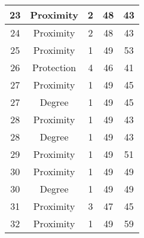 \documentclass[results.tex]{subfiles}
\begin{document}
\begin{center}
\begin{tabular}{| c || c | c | c | c |}
            \hline
            23                      & Proximity                    & 2                      & 48                      & 43                   \\
            \hline
            24                      & Proximity                    & 2                      & 48                      & 43                   \\
            \hline
            25                      & Proximity                    & 1                      & 49                      & 53                   \\
            \hline
            26                      & Protection                   & 4                      & 46                      & 41                   \\
            \hline
            27                      & Proximity                    & 1                      & 49                      & 45                   \\
            \hline
            27                      & Degree                       & 1                      & 49                      & 45                   \\
            \hline
            28                      & Proximity                    & 1                      & 49                      & 43                   \\
            \hline
            28                      & Degree                       & 1                      & 49                      & 43                   \\
            \hline
            29                      & Proximity                    & 1                      & 49                      & 51                   \\
            \hline
            30                      & Proximity                    & 1                      & 49                      & 49                   \\
            \hline
            30                      & Degree                       & 1                      & 49                      & 49                   \\
            \hline
            31                      & Proximity                    & 3                      & 47                      & 45                   \\
            \hline
            32                      & Proximity                    & 1                      & 49                      & 59                   \\

\end{tabular}
\end{center}
\end{document}
